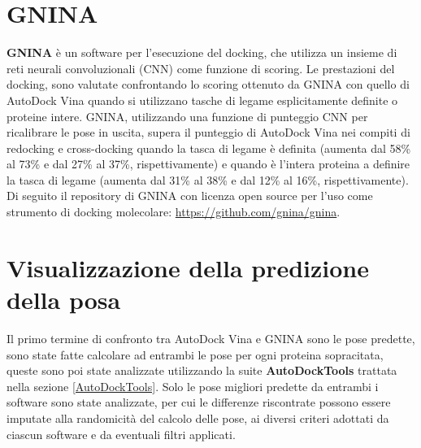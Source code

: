 \section{GNINA}
\textbf{GNINA} è un software per l'esecuzione del docking, che utilizza un insieme di reti neurali convoluzionali (CNN) come funzione di scoring. Le prestazioni del docking, sono valutate confrontando lo scoring ottenuto da GNINA con quello di AutoDock Vina quando si utilizzano tasche di legame esplicitamente definite o proteine intere. GNINA, utilizzando una funzione di punteggio CNN per ricalibrare le pose in uscita, supera il punteggio di AutoDock Vina nei compiti di redocking e cross-docking quando la tasca di legame è definita (aumenta dal 58\% al 73\% e dal 27\% al 37\%, rispettivamente) e quando è l'intera proteina a definire la tasca di legame (aumenta dal 31\% al 38\% e dal 12\% al 16\%, rispettivamente). Di seguito il repository di GNINA con licenza open source per l'uso come strumento di docking molecolare: \url{https://github.com/gnina/gnina}.\cite{mcnutt2021gnina}

\section{Visualizzazione della predizione della posa}
Il primo termine di confronto tra AutoDock Vina e GNINA sono le pose predette, sono state fatte calcolare ad entrambi le pose per ogni proteina sopracitata, queste sono poi state analizzate utilizzando la suite \textbf{AutoDockTools} trattata nella sezione \ref{AutoDockTools}.\newline
Solo le pose migliori predette da entrambi i software sono state analizzate, per cui le differenze riscontrate possono essere imputate alla randomicità del calcolo delle pose, ai diversi criteri adottati da ciascun software e da eventuali filtri applicati. 

